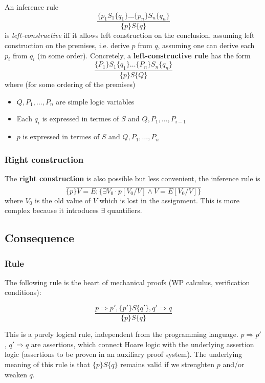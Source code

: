 \documentclass[12pt, a4paper]{book}
\begin{document}
    An inference rule
    $$
    \frac{\{ {p}_{1} {S}_{1} \{ {q}_{1} \} \ldots \{ {p}_{n} \} {S}_{n} \{ {q}_{n}\}}
    { \{ p \} S \{ q \}}
    $$
    is \textit{left-constructive} iff it allows left construction on the
    conclusion, assuming left construction on the premises, i.e. derive $p$
    from $q$, assuming one can derive each ${p}_{i}$ from $q_{i}$ (in some
    order). Concretely, a \textbf{left-constructive rule} has the form
    $$
    \frac{ \{ {P}_{1} \} {S}_{1} \{ {q}_{1} \} \ldots \{ {P}_{n} \} {S}_{n} \{ {q}_{n} \} }
    { \{ p \} S \{ Q \} }
    $$
    where (for some ordering of the premises)
    \begin{itemize}
        \item $Q, {P}_{1}, \ldots, {P}_{n}$ are simple logic variables
        \item Each ${q}_{i}$ is expressed in termes of $S$ and $Q, {P}_{1}, \ldots, {P}_{i-1}$
        \item $p$ is expressed in termes of $S$ and $Q, {P}_{1}, \ldots, {P}_{n}$
    \end{itemize}

    \subsubsection{Right construction}

    The \textbf{right construction} is also possible but less convenient, the
    inference rule is
    $$
    \frac{}
    { \{ p \} V=E; \{ \exists {V}_{0} \cdot p[{V}_{0}/V] \land V = E[{V}_{0}/V] \} }
    $$
    where ${V}_{0}$ is the old value of $V$ which is lost in the assignment.
    This is more complex because it introduces $\exists$ quantifiers.

    \subsection{Consequence}

    \subsubsection{Rule}

    The following rule is the heart of mechanical proofs (WP calculus,
    verification conditions):

    $$
    \frac{ p \Rightarrow p' , \{ p' \} S \{ q' \} , q' \Rightarrow q }
    { \{ p \} S \{ q \} }
    $$

    This is a purely logical rule, independent from the programming language.
    $p \Rightarrow p'$, $q' \Rightarrow q$ are assertions, which connect Hoare
    logic with the underlying assertion logic (assertions to be proven in an
    auxiliary proof system). The underlying meaning of this rule is that
     $\{ p \} S \{ q \}$ remains valid if we strenghten $p$ and/or weaken $q$.
\end{document}
